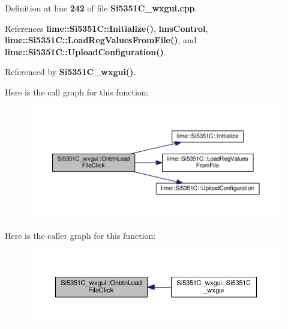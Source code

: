 Definition at line {\bf 242} of file {\bf Si5351\+C\+\_\+wxgui.\+cpp}.



References {\bf lime\+::\+Si5351\+C\+::\+Initialize()}, {\bf lms\+Control}, {\bf lime\+::\+Si5351\+C\+::\+Load\+Reg\+Values\+From\+File()}, and {\bf lime\+::\+Si5351\+C\+::\+Upload\+Configuration()}.



Referenced by {\bf Si5351\+C\+\_\+wxgui()}.



Here is the call graph for this function\+:
\nopagebreak
\begin{figure}[H]
\begin{center}
\leavevmode
\includegraphics[width=350pt]{db/d2e/classSi5351C__wxgui_a16d3cf112b48fa3c8883de4f2c0e4cef_cgraph}
\end{center}
\end{figure}




Here is the caller graph for this function\+:
\nopagebreak
\begin{figure}[H]
\begin{center}
\leavevmode
\includegraphics[width=350pt]{db/d2e/classSi5351C__wxgui_a16d3cf112b48fa3c8883de4f2c0e4cef_icgraph}
\end{center}
\end{figure}


